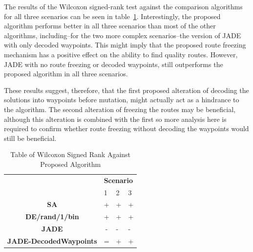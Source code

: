\documentclass[10pt,a4paper, oneside, conference]{IEEEtran}
\begin{document}
The results of the Wilcoxon signed-rank test against the comparison algorithms for all three scenarios can be seen in table~\ref{table:wilcoxonRanks}.
Interestingly, the proposed algorithm performs better in all three scenarios than most of the other algorithms, including--for the two more complex scenarios--the version of JADE with only decoded waypoints. 
This might imply that the proposed route freezing mechanism has a positive effect on the ability to find quality routes.
However, JADE with no route freezing or decoded waypoints, still outperforms the proposed algorithm in all three scenarios.

These results suggest, therefore, that the first proposed alteration of decoding the solutions into waypoints before mutation, might actually act as a hindrance to the algorithm.
The second alteration of freezing the routes may be beneficial, although this alteration is combined with the first so more analysis here is required to confirm whether route freezing without decoding the waypoints would still be beneficial.

%
%
%
%	
	
	\begin{table}[t]
\centering
\caption{Table of Wilcoxon Signed Rank Against Proposed Algorithm}
\label{table:wilcoxonRanks}
\begin{tabular}{c|cll|}
\cline{2-4}
\multicolumn{1}{l|}{}                       & \multicolumn{3}{l|}{\textbf{Scenario}} \\
\multicolumn{1}{l|}{\textbf{}}              & \multicolumn{1}{l}{1}    & 2    & 3    \\ \hline
\multicolumn{1}{|c|}{\textbf{SA}}                    & +               & +    & +    \\
\multicolumn{1}{|c|}{\textbf{DE/rand/1/bin}}         & +               & +    & +    \\
\multicolumn{1}{|c|}{\textbf{JADE}}                  & -               & -    & -    \\
\multicolumn{1}{|c|}{\textbf{JADE-DecodedWaypoints}} & =               & +    & +    \\ \hline
\end{tabular}
\end{table}
	
\end{document}
